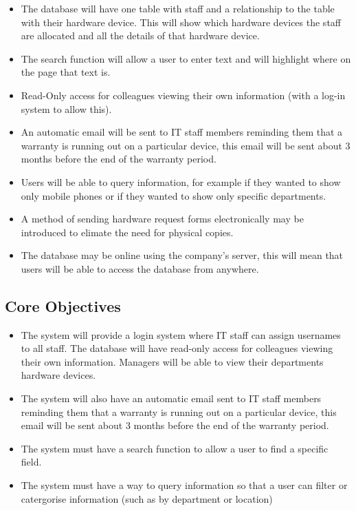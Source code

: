 \begin{itemize}
\item The database will have one table with staff and a relationship to the table with their hardware device. This will show which hardware devices the staff are allocated and all the details of that hardware device.
\item The search function will allow a user to enter text and will highlight where on the page that text is.
\item Read-Only access for colleagues viewing their own information (with a log-in system to allow this).
\item  An automatic email will be sent to IT staff members reminding them that a warranty is running out on a particular device, this email will be sent about 3 months before the end of the warranty period.
\item Users will be able to query information, for example if they wanted to show only mobile phones or if they wanted to show only specific departments.
\item A method of sending hardware request forms electronically may be introduced to elimate the need for physical copies.
\item The database may be online using the company's server, this will mean that users will be able to access the database from anywhere.
\end{itemize}

\subsection{Core Objectives}
\begin{itemize}
\item The system will provide a login system where IT staff can assign usernames to all staff. The database will have read-only access for colleagues viewing their own information. Managers will be able to view their departments hardware devices.
\item The system will also have an automatic email sent to IT staff members reminding them that a warranty is running out on a particular device, this email will be sent about 3 months before the end of the warranty period.
\item The system must have a search function to allow a user to find a specific field.
\item The system must have a way to query information so that a user can filter or catergorise information (such as by department or location)
\end{itemize}

